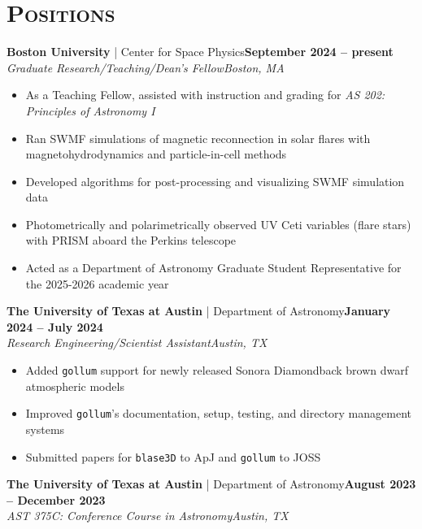 \documentclass[11pt]{article}
\begin{document}
\section{\textsc{Positions}}
\normalsize\textbf{Boston University} | Center for Space Physics\hfill\small\textbf{September 2024 -- present}
\\ \textit{Graduate Research/Teaching/Dean's Fellow\hfill Boston, MA} \vspace{-15pt}
\\ \begin{itemize}[itemsep=-3pt, parsep=3pt, label={--}]
    \item As a Teaching Fellow, assisted with instruction and grading for \textit{AS 202: Principles of Astronomy I}
    \item Ran SWMF simulations of magnetic reconnection in solar flares with magnetohydrodynamics and particle-in-cell methods
    \item Developed algorithms for post-processing and visualizing SWMF simulation data
    \item Photometrically and polarimetrically observed UV Ceti variables (flare stars) with PRISM aboard the Perkins telescope
    \item Acted as a Department of Astronomy Graduate Student Representative for the 2025-2026 academic year
\end{itemize}
\normalsize\textbf{The University of Texas at Austin} | Department of Astronomy\hfill\small\textbf{January 2024 -- July 2024}
\\ \textit{Research Engineering/Scientist Assistant\hfill Austin, TX} \vspace{-15pt}
\\ \begin{itemize}[itemsep=-3pt, parsep=3pt, label={--}]
    \item Added \texttt{gollum} support for newly released Sonora Diamondback brown dwarf atmospheric models
    \item Improved \texttt{gollum}'s documentation, setup, testing, and directory management systems
    \item Submitted papers for \texttt{blase3D} to ApJ and \texttt{gollum} to JOSS
\end{itemize}
\normalsize\textbf{The University of Texas at Austin} | Department of Astronomy\hfill\small\textbf{August 2023 -- December 2023}
\\ \textit{AST 375C: Conference Course in Astronomy\hfill Austin, TX} \vspace{-15pt}
\end{document}
